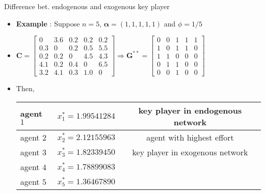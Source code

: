 \documentclass[10pt,dvipdfmx]{beamer}
\begin{document}
\begin{frame}{Difference bet. endogenous and exogenous key player}
\begin{itemize}
    \item {\bf{Example}} : Suppose $n=5$, $\bm{\alpha} = (1, 1, 1, 1, 1)$ and $\phi = 1/5$
    \item $\bm{C} = \left[
            \begin{array}{ccccc}
                0 & 3.6 & 0.2 & 0.2 & 0.2 \\
                0.3 & 0 & 0.2 & 0.5 & 5.5 \\
                0.2 & 0.2 & 0 & 4.5 & 4.3 \\
                4.1 & 0.2 & 0.4 & 0 & 6.5 \\
                3.2 & 4.1 & 0.3 & 1.0 & 0
            \end{array} \right] \Rightarrow \bm{G}^{**} = \left[
            \begin{array}{ccccc}
                0 & 0 & 1 & 1 & 1 \\
                1 & 0 & 1 & 1 & 0 \\
                1 & 1 & 0 & 0 & 0 \\
                0 & 1 & 1 & 0 & 0 \\
                0 & 0 & 1 & 0 & 0
            \end{array} \right]$
    \item Then,
        \begin{table}[htb]
          \begin{center}
            \begin{tabular}{|l|l|c|} \hline
              agent $1$ & $x_1^* = 1.99541284$ & key player in endogenous network \\ \hline
              agent $2$ & $x_2^* = 2.12155963$ & agent with highest effort \\ \hline
              agent $3$ & $x_3^* = 1.82339450$  & key player in exogenous network \\ \hline
              agent $4$ & $x_4^* = 1.78899083$ & \  \\ \hline
              agent $5$ & $x_5^* = 1.36467890$ & \ \\ \hline
            \end{tabular}
          \end{center}
        \end{table}
\end{itemize}
\end{frame}
\end{document}
